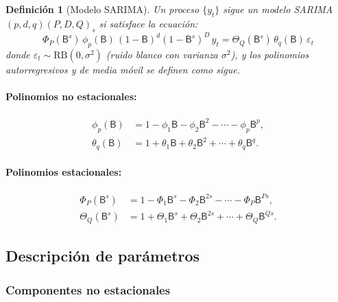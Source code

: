 \documentclass[12pt,a4paper]{article}
\newtheorem{definicion}{Definición}[section]
\newcommand{\B}{\mathsf{B}}          %
\begin{document}
\begin{definicion}[Modelo SARIMA]
Un proceso $\{y_t\}$ sigue un modelo SARIMA$(p,d,q)(P,D,Q)_s$ si satisface la ecuación:
\begin{equation}
  \label{eq:sarima}
  \boxed{
    \Phi_P(\B^s)\,\phi_p(\B)\,(1-\B)^d(1-\B^s)^D\,y_t
    = \Theta_Q(\B^s)\,\theta_q(\B)\,\varepsilon_t
  }
\end{equation}
donde $\varepsilon_t \sim \text{RB}(0,\sigma^2)$ (ruido blanco con varianza $\sigma^2$), y los
polinomios autorregresivos y de media móvil se definen como sigue.
\end{definicion}

\paragraph{Polinomios no estacionales:}
\begin{align}
  \phi_p(\B)   &= 1 - \phi_1 \B - \phi_2 \B^2 - \cdots - \phi_p \B^p, \label{eq:phi}\\
  \theta_q(\B) &= 1 + \theta_1 \B + \theta_2 \B^2 + \cdots + \theta_q \B^q. \label{eq:theta}
\end{align}

\paragraph{Polinomios estacionales:}
\begin{align}
  \Phi_P(\B^s)   &= 1 - \Phi_1 \B^s - \Phi_2 \B^{2s} - \cdots - \Phi_P \B^{Ps}, \label{eq:Phi}\\
  \Theta_Q(\B^s) &= 1 + \Theta_1 \B^s + \Theta_2 \B^{2s} + \cdots + \Theta_Q \B^{Qs}. \label{eq:Theta}
\end{align}

\subsection{Descripción de parámetros}

\subsubsection{Componentes no estacionales}
\end{document}
